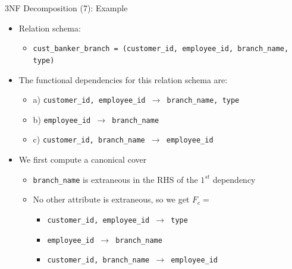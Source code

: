 \documentclass[aspectratio=169, xcolor=dvipsnames]{beamer}
\begin{document}
\begin{frame}{3NF Decomposition (7): Example}
    \begin{itemize}[<+->]
        \item Relation schema:
        \begin{itemize}
            \item[$\triangleright$] \texttt{cust\_banker\_branch = (customer\_id, employee\_id, branch\_name, type)}
        \end{itemize}
        \item The functional dependencies for this relation schema are:
        \begin{itemize}
            \item[$\triangleright$] a) \texttt{customer\_id, employee\_id $\rightarrow$ branch\_name, type}
            \item[$\triangleright$] b) \texttt{employee\_id $\rightarrow$ branch\_name}
            \item[$\triangleright$] c) \texttt{customer\_id, branch\_name $\rightarrow$ employee\_id}
        \end{itemize}
        \item We first compute a canonical cover
        \begin{itemize}
            \item[$\triangleright$] \texttt{branch\_name} is extraneous in the RHS of the $1^{st}$ dependency
            \item[$\triangleright$] No other attribute is extraneous, so we get $F_c = $
            \begin{itemize}
                \item \texttt{customer\_id, employee\_id $\rightarrow$ type}
                \item \texttt{employee\_id $\rightarrow$ branch\_name}
                \item \texttt{customer\_id, branch\_name $\rightarrow$ employee\_id}
            \end{itemize}
        \end{itemize}
    \end{itemize}
\end{frame}
\end{document}
